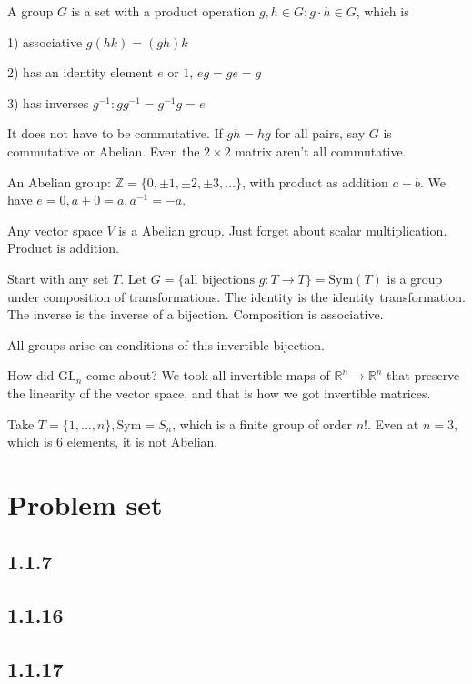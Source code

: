 \documentclass[12pt]{article}
\newcommand{\RR}{\mathbb{R}}
\newcommand{\GL}{\text{GL}}
\newcommand{\inv}[1]{#1^{-1}}}
\theoremstyle{definition}
\begin{document}
A group \(G\) is a set with a product operation \(g,h\in G: g\cdot h\in G\), which is

1) associative \(g(hk) = (gh)k\)

2) has an identity element \(e\) or \(1\), \(eg=ge=g\)

3) has inverses \(\inv{g}: g\inv{g}=\inv{g}g=e\)

It does not have to be commutative. If \(gh=hg\) for all pairs, say \(G\) is commutative or Abelian.
Even the \(2 \times 2\) matrix aren't all commutative.

An Abelian group: \(\mathbb{Z} = \{0, \pm1, \pm2, \pm3, \ldots\}\),
with product as addition \(a + b\). We have \(e = 0, a+0=a, \inv{a}=-a\).

Any vector space \(V\) is a Abelian group. Just forget about scalar multiplication. Product is addition.

Start with any set \(T\). Let \(G = \{\text{all bijections } g:T\rightarrow T\}=\text{Sym}(T)\)
is a group under composition of transformations. The identity is the identity transformation.
The inverse is the inverse of a bijection. Composition is associative.

All groups arise on conditions of this invertible bijection.

How did \(\GL_n\) come about? We took all invertible maps of \(\RR^n\rightarrow\RR^n\) that
preserve the linearity of the vector space, and that is how we got invertible matrices.

Take \(T=\{1,\ldots,n\},\text{Sym}=S_n\), which is a finite group of order \(n!\).
Even at \(n=3\), which is 6 elements, it is not Abelian.

\section{Problem set}
\subsection{1.1.7}
\subsection{1.1.16}
\subsection{1.1.17}
\end{document}
